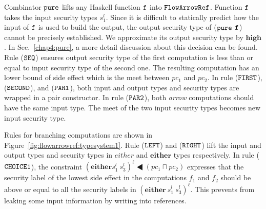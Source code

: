\documentclass[a4paper]{report}
\newcommand{\co}[1]{$\cod{#1}$}
\newcommand{\sts}[1]{s_{#1}^l}
\newcommand{\sleql}{\LHD}
\begin{document}
Combinator \co{pure} lifts any Haskell function \co{f} into \co{FlowArrowRef}. 
Function \co{f} takes the input security types $\sts{1}$.
Since it is difficult to statically predict how the input of \co{f} is used to build the output,
the output security type of (\co{pure} \co{f}) cannot be precisely established.
We approximate its output security type by $\mathbf{high}$.
In Sec.~\ref{chap4:pure}, a more detail discussion about this decision can be found.
Rule (\co{SEQ}) ensures output security type
of the first computation is less than or equal to input security type of the second one.
The resulting computation has an lower bound of side effect which is the meet
between $pc_1$ and $pc_2$.
In rule (\co{FIRST}), (\co{SECOND}), and (\co{PAR1}), both input and output types and security types
are wrapped in a pair constructor.
In rule (\co{PAR2}), both {\em arrow} computations should have the same input type.
The meet of the two input security types becomes new input security type.

Rules for branching computations are shown in Figure~\ref{fig:flowarrowref:typesystem1}.
Rule (\co{LEFT}) and (\co{RIGHT}) lift the input and output
types and security types in $either$ and $\mathbf{either}$ types respectively. 
In rule (\co{CHOICE1}),  
the constraint $(\mathbf{either} \sts{1}\ \sts{3})^\ell\sleql (pc_1\sqcap pc_2)$
expresses that the security label of the lowest side effect in the computations $f_1$ and $f_2$ should be 
above or equal to all the security labels in $(\mathbf{either}~\sts{1}~\sts{3})^\ell$. 
This prevents from leaking some input information by writing into references.
\end{document}
